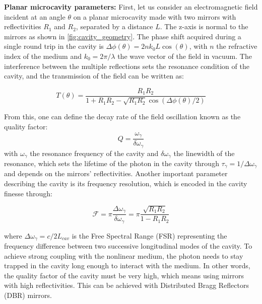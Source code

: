 \textbf{Planar microcavity parameters:}
First, let us consider an electromagnetic field incident at an angle $\theta$ on a planar microcavity made with two mirrors with reflectivities $R_1$ and $R_2$, separated by a distance $L$. The z-axis is normal to the mirrors as shown in \autoref{fig:cavity_geometry}. The phase shift acquired during a single round trip in the cavity is $\Delta \phi (\theta)=2nk_0L\cos(\theta)$, with $n$ the refractive index of the medium and $k_0=2\pi/\lambda$ the wave vector of the field in vacuum. The interference between the multiple reflections sets the resonance condition of the cavity, and the transmission of the field can be written as:

\begin{equation}
    T(\theta)=\frac{R_1R_2}{1+R_1R_2-\sqrt{R_1R_2}\cos(\Delta \phi(\theta)/2)}
    \label{eq:transmission_theta}
\end{equation}

\noindent From this, one can define the decay rate of the field oscillation known as the quality factor:
\begin{equation}
    Q=\frac{\omega_\gamma}{\delta \omega_\gamma}
    \label{eq:Q}
\end{equation}
with $\omega_\gamma$ the resonance frequency of the cavity and $\delta \omega_\gamma$ the linewidth of the resonance, which sets the lifetime of the photon in the cavity through $\tau_\gamma=1/\Delta \omega_\gamma$ and depends on the mirrors' reflectivities. Another important parameter describing the cavity is its frequency resolution, which is encoded in the cavity finesse through:

\begin{equation}
    \mathcal{F}=\pi \frac{\Delta \omega_\gamma}{\delta \omega_\gamma} = \pi \frac{\sqrt{R_1R_2}}{1-R_1R_2}
    \label{eq:F}
\end{equation}

where $\Delta \omega_\gamma= c/2L_{cav}$ is the Free Spectral Range (FSR) representing the frequency difference between two successive longitudinal modes of the cavity. To achieve strong coupling with the nonlinear medium, the photon needs to stay trapped in the cavity long enough to interact with the medium. In other words, the quality factor of the cavity must be very high, which means using mirrors with high reflectivities. This can be achieved with Distributed Bragg Reflectors (DBR) mirrors.

